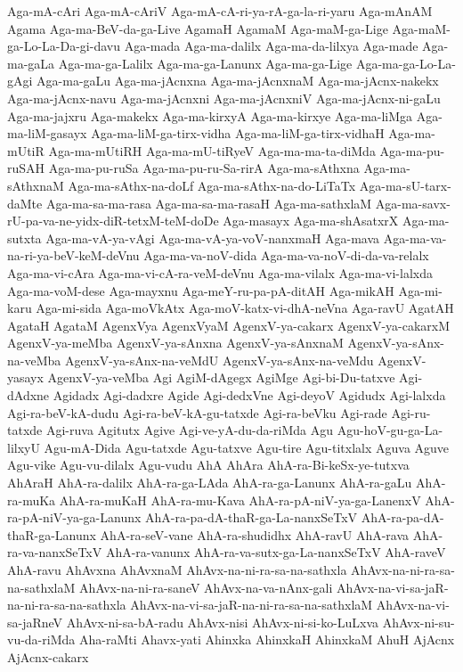 {Aga-mA-cAri
Aga-mA-cAriV
Aga-mA-cA-ri-ya-rA-ga-la-ri-yaru
Aga-mAnAM
Agama
Aga-ma-BeV-da-ga-Live
AgamaH
AgamaM
Aga-maM-ga-Lige
Aga-maM-ga-Lo-La-Da-gi-davu
Aga-mada
Aga-ma-dalilx
Aga-ma-da-lilxya
Aga-made
Aga-ma-gaLa
Aga-ma-ga-Lalilx
Aga-ma-ga-Lanunx
Aga-ma-ga-Lige
Aga-ma-ga-Lo-La-gAgi
Aga-ma-gaLu
Aga-ma-jAcnxna
Aga-ma-jAcnxnaM
Aga-ma-jAcnx-nakekx
Aga-ma-jAcnx-navu
Aga-ma-jAcnxni
Aga-ma-jAcnxniV
Aga-ma-jAcnx-ni-gaLu
Aga-ma-jajxru
Aga-makekx
Aga-ma-kirxyA
Aga-ma-kirxye
Aga-ma-liMga
Aga-ma-liM-gasayx
Aga-ma-liM-ga-tirx-vidha
Aga-ma-liM-ga-tirx-vidhaH
Aga-ma-mUtiR
Aga-ma-mUtiRH
Aga-ma-mU-tiRyeV
Aga-ma-ma-ta-diMda
Aga-ma-pu-ruSAH
Aga-ma-pu-ruSa
Aga-ma-pu-ru-Sa-rirA
Aga-ma-sAthxna
Aga-ma-sAthxnaM
Aga-ma-sAthx-na-doLf
Aga-ma-sAthx-na-do-LiTaTx
Aga-ma-sU-tarx-daMte
Aga-ma-sa-ma-rasa
Aga-ma-sa-ma-rasaH
Aga-ma-sathxlaM
Aga-ma-savx-rU-pa-va-ne-yidx-diR-tetxM-teM-doDe
Aga-masayx
Aga-ma-shAsatxrX
Aga-ma-sutxta
Aga-ma-vA-ya-vAgi
Aga-ma-vA-ya-voV-nanxmaH
Aga-mava
Aga-ma-va-na-ri-ya-beV-keM-deVnu
Aga-ma-va-noV-dida
Aga-ma-va-noV-di-da-va-relalx
Aga-ma-vi-cAra
Aga-ma-vi-cA-ra-veM-deVnu
Aga-ma-vilalx
Aga-ma-vi-lalxda
Aga-ma-voM-dese
Aga-mayxnu
Aga-meY-ru-pa-pA-ditAH
Aga-mikAH
Aga-mi-karu
Aga-mi-sida
Aga-moVkAtx
Aga-moV-katx-vi-dhA-neVna
Aga-ravU
AgatAH
AgataH
AgataM
AgenxVya
AgenxVyaM
AgenxV-ya-cakarx
AgenxV-ya-cakarxM
AgenxV-ya-meMba
AgenxV-ya-sAnxna
AgenxV-ya-sAnxnaM
AgenxV-ya-sAnx-na-veMba
AgenxV-ya-sAnx-na-veMdU
AgenxV-ya-sAnx-na-veMdu
AgenxV-yasayx
AgenxV-ya-veMba
Agi
AgiM-dAgegx
AgiMge
Agi-bi-Du-tatxve
Agi-dAdxne
Agidadx
Agi-dadxre
Agide
Agi-dedxVne
Agi-deyoV
Agidudx
Agi-lalxda
Agi-ra-beV-kA-dudu
Agi-ra-beV-kA-gu-tatxde
Agi-ra-beVku
Agi-rade
Agi-ru-tatxde
Agi-ruva
Agitutx
Agive
Agi-ve-yA-du-da-riMda
Agu
Agu-hoV-gu-ga-La-lilxyU
Agu-mA-Dida
Agu-tatxde
Agu-tatxve
Agu-tire
Agu-titxlalx
Aguva
Aguve
Agu-vike
Agu-vu-dilalx
Agu-vudu
AhA
AhAra
AhA-ra-Bi-keSx-ye-tutxva
AhAraH
AhA-ra-dalilx
AhA-ra-ga-LAda
AhA-ra-ga-Lanunx
AhA-ra-gaLu
AhA-ra-muKa
AhA-ra-muKaH
AhA-ra-mu-Kava
AhA-ra-pA-niV-ya-ga-LanenxV
AhA-ra-pA-niV-ya-ga-Lanunx
AhA-ra-pa-dA-thaR-ga-La-nanxSeTxV
AhA-ra-pa-dA-thaR-ga-Lanunx
AhA-ra-seV-vane
AhA-ra-shudidhx
AhA-ravU
AhA-rava
AhA-ra-va-nanxSeTxV
AhA-ra-vanunx
AhA-ra-va-sutx-ga-La-nanxSeTxV
AhA-raveV
AhA-ravu
AhAvxna
AhAvxnaM
AhAvx-na-ni-ra-sa-na-sathxla
AhAvx-na-ni-ra-sa-na-sathxlaM
AhAvx-na-ni-ra-saneV
AhAvx-na-va-nAnx-gali
AhAvx-na-vi-sa-jaR-na-ni-ra-sa-na-sathxla
AhAvx-na-vi-sa-jaR-na-ni-ra-sa-na-sathxlaM
AhAvx-na-vi-sa-jaRneV
AhAvx-ni-sa-bA-radu
AhAvx-nisi
AhAvx-ni-si-ko-LuLxva
AhAvx-ni-su-vu-da-riMda
Aha-raMti
Ahavx-yati
Ahinxka
AhinxkaH
AhinxkaM
AhuH
AjAcnx
AjAcnx-cakarx
}
